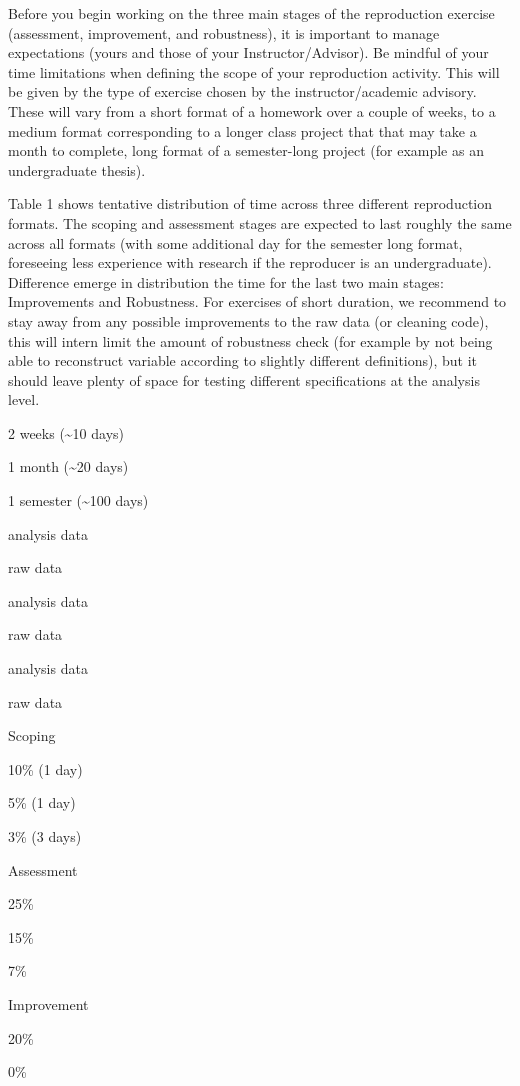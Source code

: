 \documentclass[]{book}
\begin{document}
Before you begin working on the three main stages of the reproduction exercise (assessment, improvement, and robustness), it is important to manage expectations (yours and those of your Instructor/Advisor). Be mindful of your time limitations when defining the scope of your reproduction activity. This will be given by the type of exercise chosen by the instructor/academic advisory. These will vary from a short format of a homework over a couple of weeks, to a medium format corresponding to a longer class project that that may take a month to complete, long format of a semester-long project (for example as an undergraduate thesis).

Table 1 shows tentative distribution of time across three different reproduction formats. The scoping and assessment stages are expected to last roughly the same across all formats (with some additional day for the semester long format, foreseeing less experience with research if the reproducer is an undergraduate). Difference emerge in distribution the time for the last two main stages: Improvements and Robustness. For exercises of short duration, we recommend to stay away from any possible improvements to the raw data (or cleaning code), this will intern limit the amount of robustness check (for example by not being able to reconstruct variable according to slightly different definitions), but it should leave plenty of space for testing different specifications at the analysis level.

2 weeks (\textasciitilde{}10 days)

1 month (\textasciitilde{}20 days)

1 semester (\textasciitilde{}100 days)

analysis data

raw data

analysis data

raw data

analysis data

raw data

Scoping

10\% (1 day)

5\% (1 day)

3\% (3 days)

Assessment

25\%

15\%

7\%

Improvement

20\%

0\%
\end{document}
